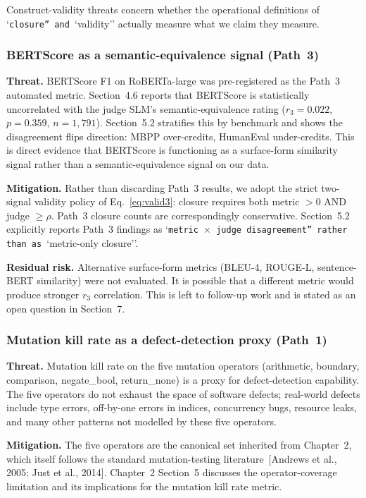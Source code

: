 Construct-validity threats concern whether the operational definitions of `\texttt{closure'' and }`validity'' actually measure what we claim they measure.

\subsubsection{BERTScore as a semantic-equivalence signal (Path~3)}

\textbf{Threat.} BERTScore F1 on RoBERTa-large was pre-registered as the Path~3 automated metric. Section~4.6 reports that BERTScore is statistically uncorrelated with the judge SLM's semantic-equivalence rating ($r_3 = 0.022$, $p = 0.359$, $n = 1{,}791$). Section~5.2 stratifies this by benchmark and shows the disagreement flips direction: MBPP over-credits, HumanEval under-credits. This is direct evidence that BERTScore is functioning as a surface-form similarity signal rather than a semantic-equivalence signal on our data.

\textbf{Mitigation.} Rather than discarding Path~3 results, we adopt the strict two-signal validity policy of Eq.~\ref{eq:valid3}: closure requires both metric $> 0$ AND judge $\geq \rho$. Path~3 closure counts are correspondingly conservative. Section~5.2 explicitly reports Path~3 findings as `\texttt{metric $\times$ judge disagreement'' rather than as }`metric-only closure''.

\textbf{Residual risk.} Alternative surface-form metrics (BLEU-4, ROUGE-L, sentence-BERT similarity) were not evaluated. It is possible that a different metric would produce stronger $r_3$ correlation. This is left to follow-up work and is stated as an open question in Section~7.

\subsubsection{Mutation kill rate as a defect-detection proxy (Path~1)}

\textbf{Threat.} Mutation kill rate on the five mutation operators (arithmetic, boundary, comparison, negate\_bool, return\_none) is a proxy for defect-detection capability. The five operators do not exhaust the space of software defects; real-world defects include type errors, off-by-one errors in indices, concurrency bugs, resource leaks, and many other patterns not modelled by these five operators.

\textbf{Mitigation.} The five operators are the canonical set inherited from Chapter~2, which itself follows the standard mutation-testing literature~[Andrews et al., 2005; Just et al., 2014]. Chapter~2 Section~5 discusses the operator-coverage limitation and its implications for the mutation kill rate metric.

